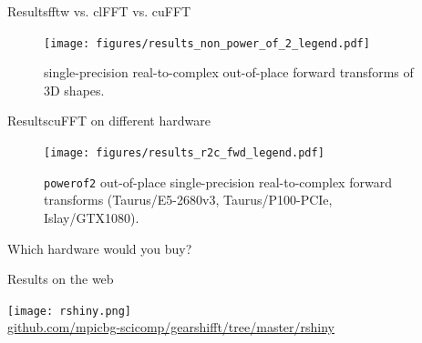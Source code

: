 \documentclass[t,11pt,hyperref={
  pdftitle = {gearshifft},
  pdfsubject = {gearshifft},
  pdfborder={0 0 0},
  colorlinks=true,
  urlcolor=red,
  citecolor=red,
  linkcolor=red,
  pdfauthor={Peter Steinbach, Matthias Werner}
  }
]{beamer}
\def\resetbeamertemplate{\setbeamertemplate{background canvas}{ }}
\begin{document}
\begin{frame}{Results}{fftw vs. clFFT vs. cuFFT}
\begin{figure}[!tbp]
  \centering
  \texttt{[image: figures/results\_non\_power\_of\_2\_legend.pdf]}\\[-1em]
  \hfill
  \caption{single-precision real-to-complex out-of-place forward transforms of 3D shapes.}
  \label{fig:non_power_of_2}
\end{figure}
\end{frame}

\begin{frame}{Results}{cuFFT on different hardware}
\vfill
\begin{figure}[!tbp]
  \centering
  \texttt{[image: figures/results\_r2c\_fwd\_legend.pdf]}\vspace{-1em}
  \hfill
  \caption{\texttt{powerof2} out-of-place single-precision real-to-complex forward transforms (Taurus/E5-2680v3, Taurus/P100-PCIe, Islay/GTX1080).}
  \label{fig:power_of_2}
\end{figure}
\vfill
\begin{center}
  \large
  Which hardware would you buy?
\end{center}
\vfill
\end{frame}


\begin{frame}{Results on the web}
  \begin{center}
    \texttt{[image: rshiny.png]}\\[20pt]
    \href{https://github.com/mpicbg-scicomp/gearshifft/tree/master/rshiny}{github.com/mpicbg-scicomp/gearshifft/tree/master/rshiny}
  \end{center}

\end{frame}

\end{document}
